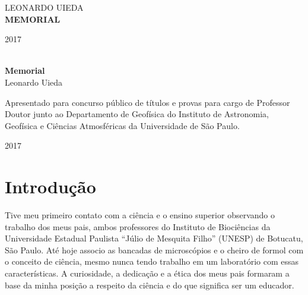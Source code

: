 \documentclass[12pt,a4paper,oneside,titlepage,onecolumn]{article}
\begin{document}
\begin{titlepage}
    \begin{center}

        \begingroup
        \selectfont
        {\large LEONARDO UIEDA}
        \\[9.5cm]

        {\fontsize{40}{0}\selectfont \bfseries MEMORIAL}
        \vfill

        {\large 2017}
        \endgroup
    \end{center}
\end{titlepage}


\begin{titlepage}
    \begin{center}
        \hspace{\fill}
        \\[6cm]

        {\Huge \textbf{Memorial}}
        \\[3cm]

        {\Large Leonardo Uieda}
        \\[3cm]

        \begin{flushright}
        \parbox{9cm}{\large
            Apresentado para concurso público de títulos e provas para cargo de
            Professor Doutor junto ao Departamento de Geofísica do Instituto de
            Astronomia, Geofísica e Ciências Atmosféricas da Universidade de
            São Paulo.
        }
        \end{flushright}
        \vfill

        {\large 2017}
    \end{center}
\end{titlepage}


\singlespacing

\thispagestyle{plain}
\tableofcontents
\newpage

\onehalfspacing

\section{Introdução}

Tive meu primeiro contato com a ciência e o ensino superior observando o
trabalho dos meus pais, ambos professores do Instituto de Biociências da
Universidade Estadual Paulista ``Júlio de Mesquita Filho'' (UNESP) de Botucatu,
São Paulo.
Até hoje associo as bancadas de microscópios e o cheiro de formol com o
conceito de ciência, mesmo nunca tendo trabalho em um laboratório com essas
características.
A curiosidade, a dedicação e a ética dos meus pais formaram a base da minha
posição a respeito da ciência e do que significa ser um educador.
\end{document}
